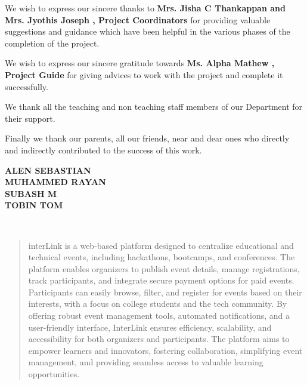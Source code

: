 \documentclass[twoside,a4paper,openright]{report} %
\begin{document}
We wish to express our sincere thanks to  \textbf{Mrs. Jisha C Thankappan and Mrs. Jyothis Joseph , Project Coordinators } for providing valuable suggestions and guidance which have been helpful in the various phases of the completion of the project.

We wish to express our sincere gratitude towards \textbf{Ms. Alpha Mathew , Project Guide } for giving advices to work with the project and complete it successfully.

We thank all the teaching and non teaching staff members of our Department for their support.


Finally we thank our parents, all our friends, near and dear ones who directly and indirectly contributed to the success of this work.

\begin{flushright}                                      

\textbf{ALEN SEBASTIAN \\
	MUHAMMED RAYAN \\
	SUBASH M\\
	TOBIN TOM
} 
\end{flushright} 
	
	
	
	
	
	
	


\thispagestyle{empty}

\mbox{~}
\begin{abstract}
	interLink is a web-based platform designed to centralize educational and technical events, including hackathons, bootcamps, and conferences. The platform enables organizers to publish event details, manage registrations, track participants, and integrate secure payment options for paid events. Participants can easily browse, filter, and register for events based on their interests, with a focus on college students and the tech community. By offering robust event management tools, automated notifications, and a user-friendly interface, InterLink ensures efficiency, scalability, and accessibility for both organizers and participants. The platform aims to empower learners and innovators, fostering collaboration, simplifying event management, and providing seamless access to valuable learning opportunities.
\end{abstract}	
\end{document}
